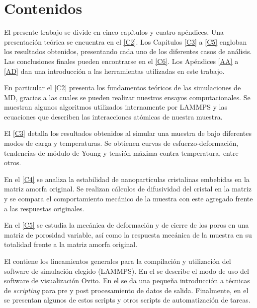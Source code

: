 
\section{Contenidos}
\label{S1_6}

El presente trabajo se divide en cinco capítulos y cuatro apéndices. Una presentación teórica se encuentra en el \cref{C2}. Los Capítulos \ref{C3} a \ref{C5} engloban los resultados obtenidos, presentando cada uno de los diferentes casos de análisis. Las conclusiones finales pueden encontrarse en el \cref{C6}. Los Apéndices \ref{AA} a \ref{AD} dan una introducción a las herramientas utilizadas en este trabajo.

En particular el \cref{C2} presenta los fundamentos teóricos de las simulaciones de MD, gracias a las cuales se pueden realizar nuestros ensayos computacionales. Se muestran algunos algoritmos utilizados internamente por LAMMPS y las ecuaciones que describen las interacciones atómicas de nuestra muestra.

El \cref{C3} detalla los resultados obtenidos al simular una muestra de \CuZr bajo diferentes modos de carga y temperaturas. Se obtienen curvas de esfuerzo-deformación, tendencias de módulo de Young y tensión máxima contra temperatura, entre otros.

En el \cref{C4} se analiza la estabilidad de nanopartículas cristalinas embebidas en la matriz amorfa original. Se realizan cálculos de difusividad del cristal en la matriz y se compara el comportamiento mecánico de la muestra con este agregado frente a las respuestas originales.

En el \cref{C5} se estudia la mecánica de deformación y de cierre de los poros en una matriz de porosidad variable, así como la respuesta mecánica de la muestra en su totalidad frente a la matriz amorfa original. 

El  contiene los lineamientos generales para la compilación y utilización del software de simulación elegido (LAMMPS). En el  se describe el modo de uso del software de visualización Ovito. En el  se da una pequeña introducción a técnicas de \textit{scripting} para pre y post procesamiento de datos de salida. Finalmente, en el  se presentan algunos de estos scripts y otros scripts de automatización de tareas.